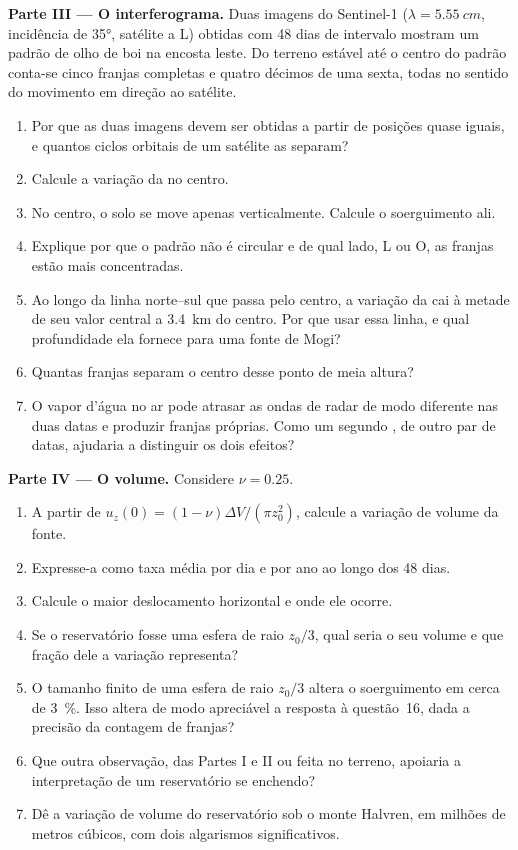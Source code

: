 \begin{problem}
\medskip\noindent\textbf{Parte III --- O interferograma.} Duas
imagens do Sentinel-1 ($\lambda = \qty{5.55}{cm}$, incidência de \ang{35}, satélite a L)
obtidas com 48 dias de intervalo mostram um padrão de olho de boi na encosta leste. Do
terreno estável até o centro do padrão conta-se cinco franjas completas e
quatro décimos de uma sexta, todas no sentido do movimento em direção ao
satélite.
\begin{enumerate}[resume]
\item Por que as duas imagens devem ser obtidas a partir de posições quase iguais, e
  quantos ciclos orbitais de um satélite as separam?
\item Calcule a variação da  no centro.
\item No centro, o solo se move apenas verticalmente. Calcule o soerguimento
  ali.
\item Explique por que o padrão não é circular e de qual lado, L ou O, as
  franjas estão mais concentradas.
\item Ao longo da linha norte--sul que passa pelo centro, a variação da 
  cai à metade de seu valor central a \qty{3.4}{km} do
  centro. Por que usar essa linha, e qual profundidade ela fornece para uma fonte
  de Mogi?
\item Quantas franjas separam o centro desse ponto de meia altura?
\item O vapor d'água no ar pode atrasar as ondas de radar de modo diferente nas duas
  datas e produzir franjas próprias. Como um segundo ,
  de outro par de datas, ajudaria a distinguir os dois efeitos?
\end{enumerate}

\medskip\noindent\textbf{Parte IV --- O volume.} Considere $\nu = 0.25$.
\begin{enumerate}[resume]
\item A partir de $u_z(0) = (1 - \nu)\Delta V/(\pi z_0^2)$, calcule a variação de volume
  da fonte.
\item Expresse-a como taxa média por dia e por ano ao longo dos 48 dias.
\item Calcule o maior deslocamento horizontal e onde ele ocorre.
\item Se o reservatório fosse uma esfera de raio $z_0/3$, qual seria o seu volume e
  que fração dele a variação representa?
\item O tamanho finito de uma esfera de raio $z_0/3$ altera o soerguimento em cerca de
  \qty{3}{\percent}. Isso altera de modo apreciável a resposta à questão~16, dada a
  precisão da contagem de franjas?
\item Que outra observação, das Partes I e II ou feita no terreno, apoiaria a
  interpretação de um reservatório se enchendo?
\item Dê a variação de volume do reservatório sob o monte Halvren, em milhões de
  metros cúbicos, com dois algarismos significativos.
\end{enumerate}
\end{problem}
